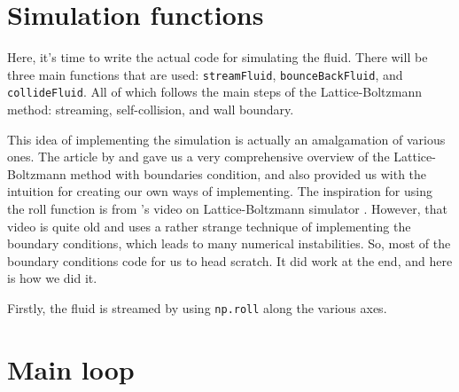 \section{Simulation functions}
\label{sec:simulation-function}

Here, it's time to write the actual code for simulating the fluid. There will be three main functions that are used: \texttt{streamFluid}, \texttt{bounceBackFluid}, and \texttt{collideFluid}. All of which follows the main steps of the Lattice-Boltzmann method: streaming, self-collision, and wall boundary.

This idea of implementing the simulation is actually an amalgamation of various ones. The article by  \cite{adams-no-date} and  \cite{schroeder-2012} gave us a very comprehensive overview of the Lattice-Boltzmann method with boundaries condition, and also provided us with the intuition for creating our own ways of implementing. The inspiration for using the roll function is from 's video on Lattice-Boltzmann simulator \cite{matias-2022}. However, that video is quite old and uses a rather strange technique of implementing the boundary conditions, which leads to many numerical instabilities. So, most of the boundary conditions code for us to head scratch. It did work at the end, and here is how we did it.

Firstly, the fluid is streamed by using \texttt{np.roll} along the various axes.

\section{Main loop}
